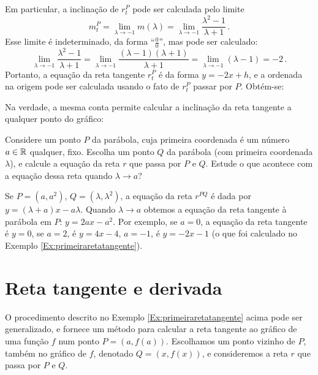 \begin{ex}
Em particular, a inclinação de $r_t^P$ pode ser calculada pelo limite 
$$
m_t^P=\lim_{\lambda\to -1}m(\lambda)=\lim_{\lambda\to
-1}\frac{\lambda^2-1}{\lambda+1}\,.$$
Esse limite é indeterminado, da forma ``$\tfrac00$'', mas pode ser calculado:
$$\lim_{\lambda\to
-1}\frac{\lambda^2-1}{\lambda+1}=\lim_{\lambda\to
-1}\frac{(\lambda-1)(\lambda+1)}{\lambda+1}
=\lim_{\lambda\to -1}(\lambda-1)=-2\,.
$$
Portanto, a equação da reta tangente $r_t^P$ é da forma $y=-2x+h$, e a ordenada
na origem pode ser calculada usando o fato de $r_t^P$ passar por $P$. Obtém-se:
\begin{center}
\begin{bmlimage}\end{bmlimage}
\end{center}
\end{ex}

Na verdade, a mesma conta permite calcular a inclinação da reta tangente a
qualquer ponto do gráfico:
\begin{exo}\label{Exo:retatangxisdois}
Considere um ponto $P$ da parábola, cuja primeira coordenada é um número
$a\in\mathbb{R}$ qualquer, fixo.
Escolha um ponto $Q$ da parábola (com primeira coordenada $\lambda$), e
calcule
a equação da reta $r$ que passa por $P$ e $Q$.
Estude o que acontece com a equação dessa reta quando $\lambda\to a$?
\begin{sol}
Se $P=(a,a^2)$, $Q=(\lambda,\lambda^2)$, a equação da reta $r^{PQ}$ é dada por
$y=(\lambda+a)x-a\lambda$. Quando $\lambda\to a$ obtemos 
a equação da reta tangente à parábola em $P$: $y=2a x-a^2$.
Por exemplo, se $a=0$, a equação da reta tangente é $y=0$, se $a=2$, é
$y=4x-4$, 
$a=-1$, é $y=-2x-1$ (o que foi calculado no Exemplo
\ref{Ex:primeiraretatangente}).
\end{sol}
\end{exo}

\section{Reta tangente e derivada}
O procedimento descrito no Exemplo \ref{Ex:primeiraretatangente} acima pode ser
generalizado, e fornece um método para calcular a reta tangente ao gráfico de
uma função $f$ num ponto $P=(a,f(a))$.
Escolhamos
um ponto vizinho de $P$, também no gráfico de $f$, denotado $Q=(x,f(x))$, e
consideremos a reta $r$ que passa por $P$ e $Q$.

